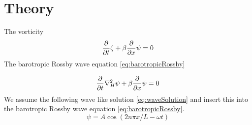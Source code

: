 \section{Theory}
The vorticity 
\begin{equation}\label{eq:gov_vort}
    \frac{\partial}{\partial t}{\zeta} + \beta \frac{\partial}{\partial x}{\psi} = 0
\end{equation}
The barotropic Rossby wave equation \cref{eq:barotropicRossby}

\begin{equation}\label{eq:barotropicRossby}
    \frac{\partial}{\partial t}{} \nabla_H^2 \psi + \beta \frac{\partial}{\partial x}{\psi} = 0 
\end{equation}
We assume the following wave like solution \cref{eq:waveSolution} and 
insert this into the barotropic Rossby wave equation \cref{eq:barotropicRossby}.
\begin{equation}\label{eq:waveSolution}
    \psi = A\cos{(2n\pi x /L - \omega t)}
\end{equation}

